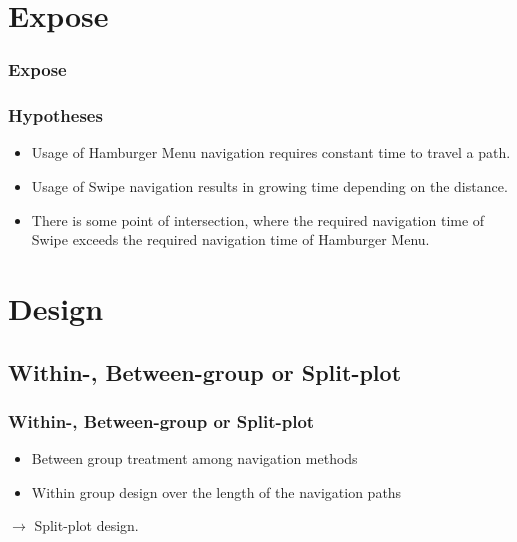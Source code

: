 \documentclass{beamer}
\begin{document}


\section{Expose}
\begin{frame}
        \frametitle{Expose}

\end{frame}

\begin{frame}
        \frametitle{Hypotheses}
        \begin{itemize}
                \item Usage of Hamburger Menu navigation requires constant time to travel a path.
                \item Usage of Swipe navigation
                        results in growing time depending on the distance.
                \item There is some point of intersection,
                        where the required navigation time of Swipe exceeds the required navigation time of Hamburger Menu.
        \end{itemize}

\end{frame}


\section{Design}
\subsection{Within-, Between-group or Split-plot}
\begin{frame}
        \frametitle{Within-, Between-group or Split-plot}
        \begin{itemize}
                \item Between group treatment among navigation methods
                \item Within group design over the length of the navigation paths
        \end{itemize}
        $\rightarrow$ Split-plot design.
\end{frame}
\end{document}
